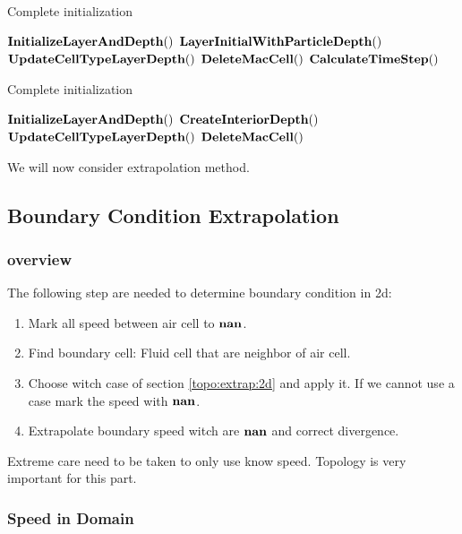 \begin{algorithm}
\caption{Complete initialization}
\label{code:initialization}
\begin{algorithmic}[1]
\State $\mathop{\textbf{InitializeLayerAndDepth}}()$
\State $\mathop{\textbf{LayerInitialWithParticleDepth}}()$
\State $\mathop{\textbf{UpdateCellTypeLayerDepth}}()$
\State $\mathop{\textbf{DeleteMacCell}}()$
\State $\mathop{\textbf{CalculateTimeStep}}()$
\EndProcedure
\end{algorithmic}
\end{algorithm}

\begin{algorithm}
\caption{Complete initialization}
\label{code:initialization2}
\begin{algorithmic}[1]
\State $\mathop{\textbf{InitializeLayerAndDepth}}()$
\State $\mathop{\textbf{CreateInteriorDepth}}()$
\State $\mathop{\textbf{UpdateCellTypeLayerDepth}}()$
\State $\mathop{\textbf{DeleteMacCell}}()$
\EndProcedure
\end{algorithmic}
\end{algorithm}

We will now consider extrapolation method.

\subsection{Boundary Condition Extrapolation}
\subsubsection{overview}

The following step are needed to determine boundary condition in 2d:
\begin{enumerate}
\item  Mark all speed between air cell to $\mathop{\textbf{nan}}$.
 \item Find boundary cell: Fluid cell that are neighbor of air cell.
 \item Choose witch case of section \ref{topo:extrap:2d} and apply it. 
 If we cannot use a case mark the speed with $\mathop{\textbf{nan}}$.
 \item Extrapolate boundary speed witch are $\mathop{\textbf{nan}}$ and correct divergence.
\end{enumerate}
Extreme care need to be taken to only use know speed. Topology is very important for this part.

\subsubsection{Speed in Domain}

